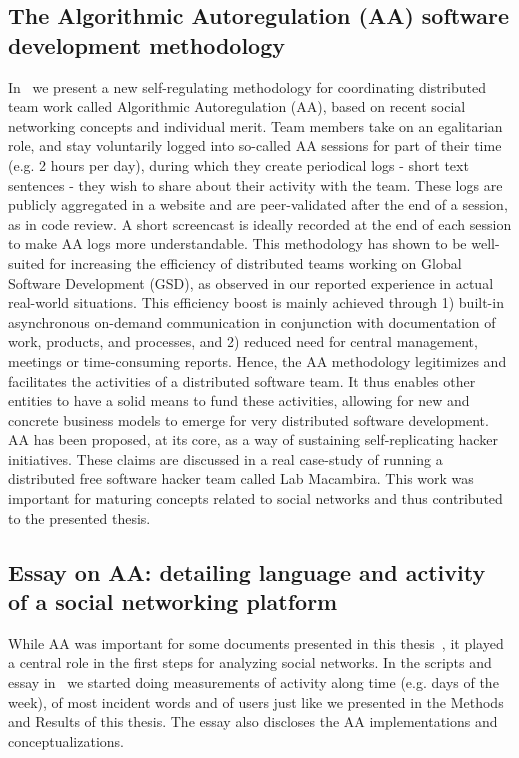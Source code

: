 \begin{apendicesenv}
\section{The Algorithmic Autoregulation (AA) software development methodology}\label{sec:aa}
In~\cite{aaPaper} we present a new self-regulating methodology for coordinating distributed team work called Algorithmic Autoregulation (AA),
based on recent social networking concepts and individual merit.
Team members take on an egalitarian role, and stay voluntarily logged into so-called AA sessions for part of their time 
(e.g. 2 hours per day), during which they create periodical logs - short text sentences - 
they wish to share about their activity with the team.
These logs are publicly aggregated in a website and are peer-validated after the end of a session,
as in code review. 
A short screencast is ideally recorded at the end of each session to make AA logs more understandable.
This methodology has shown to be well-suited for increasing the efficiency of distributed teams working on 
Global Software Development (GSD), as observed in our reported experience in actual real-world situations.
This efficiency boost is mainly achieved through 1) built-in asynchronous on-demand communication in 
conjunction with documentation of work, products, and processes, and 2) reduced need for central management,
meetings or time-consuming reports.
Hence, the AA methodology legitimizes and facilitates the activities of a distributed software team.
It thus enables other entities to have a solid means to fund these activities, 
allowing for new and concrete business models to emerge for very distributed software development. 
AA has been proposed, at its core, as a way of sustaining self-replicating hacker initiatives.
These claims are discussed in a real case-study of running a distributed free software hacker team called Lab Macambira.
This work was important for maturing concepts related to social networks and thus contributed to the presented thesis.

\subsection{Essay on AA: detailing language and activity of a social networking platform}
While AA was important for some documents presented in this thesis~\cite{aaPaper,losd},
it played a central role in the first steps for analyzing social networks.
In the scripts and essay in~\cite{ensaaio} we started doing measurements of activity along time (e.g. days of the week),
of most incident words and of users just like we presented in the Methods and Results of this thesis.
The essay also discloses the AA implementations and conceptualizations.


\end{apendicesenv}
